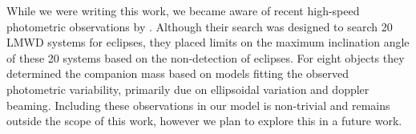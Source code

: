 \documentclass[apjl]{emulateapj}
\begin{document}
While we were writing this work, we became aware of recent high-speed photometric observations by \citet{hermes14}. Although their search was designed to search 20 LMWD systems for eclipses, they placed limits on the maximum inclination angle of these 20 systems based on the non-detection of eclipses. For eight objects they determined the companion mass based on models fitting the observed photometric variability, primarily due on ellipsoidal variation and doppler beaming. Including these observations in our model is non-trivial and remains outside the scope of this work, however we plan to explore this in a future work.


\begin{figure}[h!]
\begin{center}

\end{center}
\end{figure}
\end{document}
